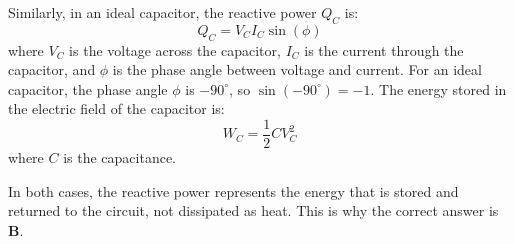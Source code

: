 Similarly, in an ideal capacitor, the reactive power \( Q_C \) is:
\[
Q_C = V_C I_C \sin(\phi)
\]
where \( V_C \) is the voltage across the capacitor, \( I_C \) is the current through the capacitor, and \( \phi \) is the phase angle between voltage and current. For an ideal capacitor, the phase angle \( \phi \) is \( -90^\circ \), so \( \sin(-90^\circ) = -1 \). The energy stored in the electric field of the capacitor is:
\[
W_C = \frac{1}{2} C V_C^2
\]
where \( C \) is the capacitance.

In both cases, the reactive power represents the energy that is stored and returned to the circuit, not dissipated as heat. This is why the correct answer is \textbf{B}.

